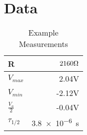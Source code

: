 \documentclass[../Lab.tex]{subfiles}
\begin{document}
\section{Data}


\begin{table}[htbp]
  \centering
  \caption{Example Measurements}
    \begin{tabular}{|l|r|}
    \hline
    R & $2160\ohm$\\
    \hline
    $V_{max}$ & 2.04V\\
    \hline
    $V_{min}$ & -2.12V\\
    \hline
    $\frac{V_o}{2}$ & -0.04V\\
    \hline
    $\tau_{1/2}$ & \SI{3.8e-6}{s}\\
    \hline
    \end{tabular}%
  \label{tab:addlabel}%
\end{table}%
\end{document}
